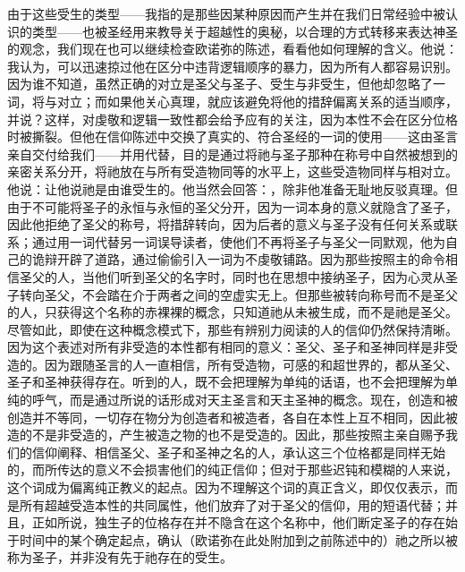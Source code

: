 由于这些受生的类型——我指的是那些因某种原因而产生并在我们日常经验中被认识的类型——也被圣经用来教导关于超越性的奥秘，以合理的方式转移来表达神圣的观念，我们现在也可以继续检查欧诺弥的陈述，看看他如何理解的含义。他说：我认为，可以迅速掠过他在区分中违背逻辑顺序的暴力，因为所有人都容易识别。因为谁不知道，虽然正确的对立是圣父与圣子、受生与非受生，但他却忽略了一词，将与对立；而如果他关心真理，就应该避免将他的措辞偏离关系的适当顺序，并说？这样，对虔敬和逻辑一致性都会给予应有的关注，因为本性不会在区分位格时被撕裂。但他在信仰陈述中交换了真实的、符合圣经的一词的使用——这由圣言亲自交付给我们——并用代替，目的是通过将祂与圣子那种在称号中自然被想到的亲密关系分开，将祂放在与所有受造物同等的水平上，这些受造物同样与相对立。他说：让他说祂是由谁受生的。他当然会回答：，除非他准备无耻地反驳真理。但由于不可能将圣子的永恒与永恒的圣父分开，因为一词本身的意义就隐含了圣子，因此他拒绝了圣父的称号，将措辞转向，因为后者的意义与圣子没有任何关系或联系；通过用一词代替另一词误导读者，使他们不再将圣子与圣父一同默观，他为自己的诡辩开辟了道路，通过偷偷引入一词为不虔敬铺路。因为那些按照主的命令相信圣父的人，当他们听到圣父的名字时，同时也在思想中接纳圣子，因为心灵从圣子转向圣父，不会踏在介于两者之间的空虚实无上。但那些被转向称号而不是圣父的人，只获得这个名称的赤裸裸的概念，只知道祂从未被生成，而不是祂是圣父。尽管如此，即使在这种概念模式下，那些有辨别力阅读的人的信仰仍然保持清晰。因为这个表述对所有非受造的本性都有相同的意义：圣父、圣子和圣神同样是非受造的。因为跟随圣言的人一直相信，所有受造物，可感的和超世界的，都从圣父、圣子和圣神获得存在。听到的人，既不会把理解为单纯的话语，也不会把理解为单纯的呼气，而是通过所说的话形成对天主圣言和天主圣神的概念。现在，创造和被创造并不等同，一切存在物分为创造者和被造者，各自在本性上互不相同，因此被造的不是非受造的，产生被造之物的也不是受造的。因此，那些按照主亲自赐予我们的信仰阐释、相信圣父、圣子和圣神之名的人，承认这三个位格都是同样无始的，而所传达的意义不会损害他们的纯正信仰；但对于那些迟钝和模糊的人来说，这个词成为偏离纯正教义的起点。因为不理解这个词的真正含义，即仅仅表示，而是所有超越受造本性的共同属性，他们放弃了对于圣父的信仰，用的短语代替；并且，正如所说，独生子的位格存在并不隐含在这个名称中，他们断定圣子的存在始于时间中的某个确定起点，确认（欧诺弥在此处附加到之前陈述中的）祂之所以被称为圣子，并非没有先于祂存在的受生。\par


